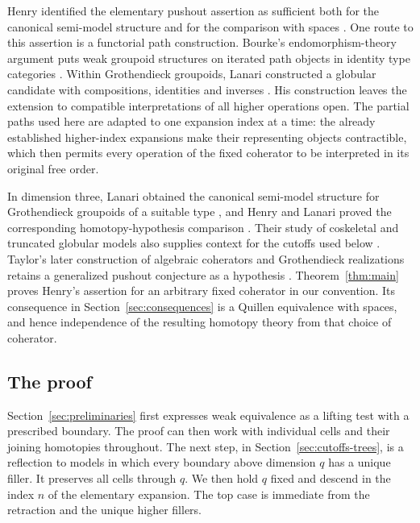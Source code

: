 Henry identified the elementary pushout assertion as sufficient both
for the canonical semi-model structure and for the comparison with
spaces \cite[Theorem~5.3.5 and Corollary~5.3.13]{Henry2016}.
One route to this assertion is a functorial path construction.
Bourke's endomorphism-theory argument puts weak groupoid structures
on iterated path objects in identity type categories
\cite[Theorem~5.1]{Bourke2016}.
Within Grothendieck groupoids, Lanari constructed a globular candidate
with compositions, identities and inverses
\cite[Definitions~5.2 and~6.1, Proposition~6.2, and Theorem~6.5]{Lanari2020}.
His construction leaves the extension to compatible interpretations
of all higher operations open.  The partial paths used here are
adapted to one expansion index at a time: the already established
higher-index expansions make their representing objects contractible,
which then permits every operation of the fixed coherator to be
interpreted in its original free order.

In dimension three, Lanari obtained the canonical semi-model structure
for Grothendieck groupoids of a suitable type
\cite[Theorem~4.10]{Lanari2018}, and Henry and Lanari proved the
corresponding homotopy-hypothesis comparison \cite{HenryLanari2023}.
Their study of coskeletal and truncated globular models also supplies
context for the cutoffs used below \cite[Section~2]{HenryLanari2023}.
Taylor's later construction of algebraic coherators and Grothendieck
realizations retains a generalized pushout conjecture as a hypothesis
\cite[Conjecture~5.7 and Theorem~5.8]{Taylor2026}.
Theorem~\ref{thm:main} proves Henry's assertion for an arbitrary fixed
coherator in our convention.  Its consequence in
Section~\ref{sec:consequences} is a Quillen equivalence with spaces,
and hence independence of the resulting homotopy theory from that
choice of coherator.

\subsection*{The proof}

Section~\ref{sec:preliminaries} first expresses weak equivalence as a
lifting test with a prescribed boundary.  The proof can then work with
individual cells and their joining homotopies throughout.
The next step, in Section~\ref{sec:cutoffs-trees}, is a reflection to models in which every boundary above
dimension \(q\) has a unique filler.  It preserves all cells through \(q\).
We then hold \(q\) fixed and descend in the index \(n\) of the elementary
expansion.  The top case is immediate from the retraction and the unique
higher fillers.


